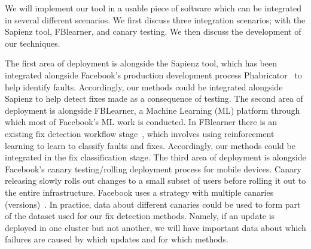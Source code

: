 
We will implement our tool in a usable piece of software which can be integrated in several different scenarios. 
We first discuss three integration scenarios; with the Sapienz tool, FBlearner, and canary testing. We then discuss the development of our techniques.

The first area of deployment is alongside the Sapienz tool, which
has been integrated alongside Facebook's production development process Phabricator~\citep{Facebook1} to help identify faults. Accordingly, our methods could be integrated alongside Sapienz to help detect fixes made as a consequence of testing. 
The second area of deployment is alongside FBLearner, a Machine Learning (ML) platform through which most of Facebook's ML work is conducted. In FBlearner there is an existing fix detection workflow stage~\citep{Facebook1}, which involves using reinforcement learning to learn to classify faults and fixes. Accordingly, our methods could be integrated in the fix classification stage. 
The third area of deployment is alongside Facebook's canary testing/rolling deployment process for mobile devices. Canary releasing slowly rolls out changes to a small subset of users before rolling it out to the entire infrastructure. Facebook uses a strategy with multiple canaries (versions)~\cite{7883285,canaryrelease}.
In practice, data about different canaries could be used to form part of the dataset used for our fix detection methods. Namely, if an update is deployed in one cluster but not another, we will have important data about which failures are caused by which updates and for which methods. 


